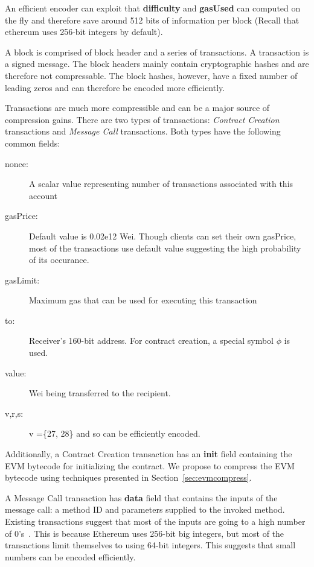 An efficient encoder can exploit that \textbf{difficulty} and \textbf{gasUsed} can computed on the fly and therefore save around 512 bits of information per block (Recall that ethereum uses 256-bit integers by default).  

A block is comprised of block header and a series of transactions. A transaction is a signed message. The block headers mainly
contain cryptographic hashes and are therefore not compressable. The block hashes, however, have a fixed number of leading zeros and
can therefore be encoded more efficiently.

Transactions are much more compressible and can be a major source of compression gains.
There are two types of transactions: {\em Contract Creation} transactions and {\em Message Call} transactions.
Both types have the following common fields:
\begin{description}
  \item[nonce:] A scalar value representing number of transactions associated with this account
  \item[gasPrice:] Default value is 0.02e12 Wei. Though clients can set their own gasPrice, most of the transactions use default value suggesting the high probability of its occurance.
  \item[gasLimit:] Maximum gas that can be used for executing this transaction
  \item[to:] Receiver's 160-bit address. For contract creation, a special symbol $\phi$ is used.
  \item[value:] Wei being transferred to the recipient.
  \item[v,r,s:] v =\{27, 28\} and so can be efficiently encoded.
\end{description}

Additionally, a Contract Creation transaction has an \textbf{init} field containing the EVM bytecode for initializing the contract.
We propose to compress the EVM bytecode using techniques presented in Section~\ref{sec:evmcompress}.

A Message Call transaction has \textbf{data} field that contains the inputs of the message call: a method ID and parameters supplied to the invoked method.
Existing transactions suggest that most of the inputs are going to a high number of 0's~\cite{ethtx}. 
This is because Ethereum uses 256-bit big integers, but most of the transactions limit themselves to using 64-bit integers.
This suggests that small numbers can be encoded efficiently.


%

